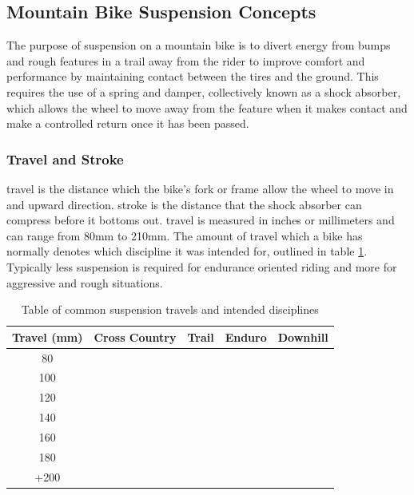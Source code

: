 	\subsection{Mountain Bike Suspension Concepts}
		The purpose of suspension on a mountain bike is to divert energy from bumps and rough features in a trail away from the rider to improve comfort and  performance by maintaining contact between the tires and the ground. This requires the use of a spring and damper, collectively known as a shock absorber, which allows the wheel to move away from the feature when it makes contact and make a controlled return once it has been passed.
	\subsubsection{Travel and Stroke} 
		\Gls{travel} is the distance which the bike's fork or frame allow the wheel to move in and upward direction. \Gls{stroke} is the distance that the shock absorber can compress before it bottoms out. \Gls{travel} is measured in inches or millimeters and can range from 80mm to 210mm. The amount of \gls{travel} which a bike has normally denotes which discipline it was intended for, outlined in table \ref{tab:travel}. Typically less suspension is required for endurance oriented riding and more for aggressive and rough situations.
		\begin{table}[h!]
		\centering
		\caption{Table of common suspension \glspl{travel} and intended disciplines}
		\label{tab:travel}
		\begin{tabular}{|c|cccc|}
			\hline
			Travel (mm)&Cross Country&Trail&Enduro&Downhill\\
			\hline
			80&\cellcolor[gray]{0.5}&&&
			\\
			100&\cellcolor[gray]{0.5}&&&
			\\
			120&\cellcolor[gray]{0.5}&\cellcolor[gray]{0.5}&&
			\\
			140&&\cellcolor[gray]{0.5}&\cellcolor[gray]{0.5}&
			\\
			160&&&\cellcolor[gray]{0.5}&
			\\
			180&&&\cellcolor[gray]{0.5}&\cellcolor[gray]{0.5}
			\\
			+200&&&&\cellcolor[gray]{0.5}\\
			\hline
		\end{tabular}
	\end{table}
